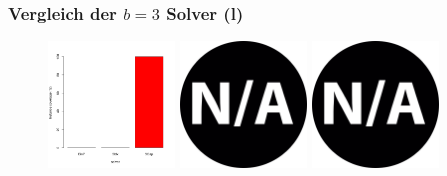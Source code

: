 \documentclass{beamer}
\begin{document}
\begin{frame}
\frametitle{Vergleich der $b = 3$ Solver (l)}

\begin{figure}
\centering
\includegraphics[width=0.3\textwidth]{images/solver_instance_coverage_b=3_l_1800s.png}
\includegraphics[width=0.3\textwidth]{images/na.png}
\includegraphics[width=0.3\textwidth]{images/na.png}
\caption*{\textsc{Zeitlimit 30min} $\quad\quad\quad$ \textsc{Zeitlimit 45min} $\quad\quad\quad$ \textsc{Zeitlimit 60min}}
\begin{subfigure}[b]{0.3\textwidth}
\centering
{}

\end{subfigure}
\end{figure}
\end{frame}
\end{document}

